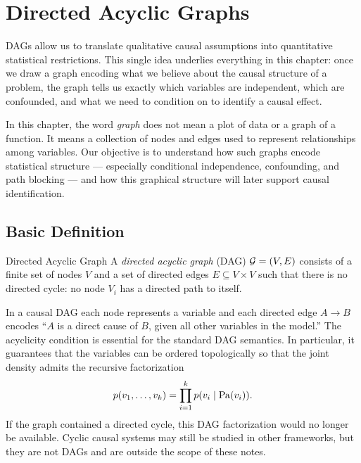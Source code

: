 \documentclass[master.tex]{subfiles}
\begin{document}
\section{Directed Acyclic Graphs}

DAGs allow us to translate qualitative causal assumptions into quantitative
statistical restrictions.  This single idea underlies everything in this
chapter: once we draw a graph encoding what we believe about the causal
structure of a problem, the graph tells us exactly which variables are
independent, which are confounded, and what we need to condition on to
identify a causal effect.

\begin{remark}
In this chapter, the word \emph{graph} does not mean a plot of data or
a graph of a function.
It means a collection of nodes and edges used to represent relationships
among variables.
Our objective is to understand how such graphs encode statistical
structure --- especially conditional independence, confounding, and path
blocking --- and how this graphical structure will later support causal
identification.
\end{remark}

\subsection{Basic Definition}

\begin{defn}{Directed Acyclic Graph}
A \emph{directed acyclic graph} (DAG) $\mathcal{G} = (V, E)$ consists of a finite
set of nodes $V$ and a set of directed edges $E \subseteq V \times V$ such that there
is no directed cycle: no node $V_i$ has a directed path to itself.
\end{defn}

In a causal DAG each node represents a variable and each directed edge $A \to B$
encodes ``$A$ is a direct cause of $B$, given all other variables in the model.''
The acyclicity condition is essential for the standard DAG semantics.
In particular, it guarantees that the variables can be ordered topologically
so that the joint density admits the recursive factorization
\[
  p(v_1,\dots,v_k) = \prod_{i=1}^{k} p(v_i \mid \mathrm{Pa}(v_i)).
\]
If the graph contained a directed cycle, this DAG factorization would no longer
be available.  Cyclic causal systems may still be studied in other frameworks,
but they are not DAGs and are outside the scope of these notes.
\end{document}
